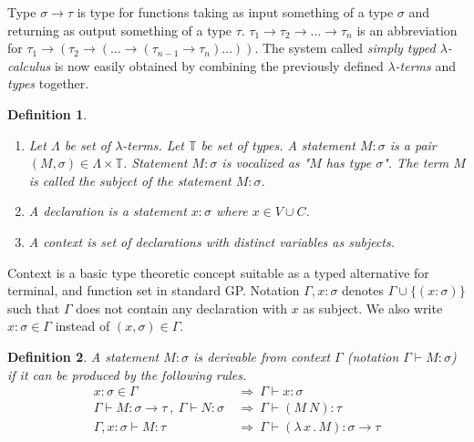 \documentclass{sig-alternate}
\newtheorem{definition}{Definition}
\newcommand{\lterms}{$\lambda$-terms\xspace}
\newcommand{\tur}[3]{#1\vdash{}#2 \colon #3}
\newcommand{\then}{\Rightarrow\xspace}
\newcommand{\lamb}[2]{( \lambda \, #1 \, . \, #2 )}
\newcommand{\ar}{\rightarrow\xspace}
\begin{document}
Type $\sigma \ar \tau$ is type for functions taking as input
something of a type $\sigma$ and returning 
as output something of a type $\tau$. 
$\tau_1 \ar \tau_2 \ar \dots \ar \tau_n$ is an abbreviation for 
$\tau_1 \ar (\tau_2 \ar (\dots \ar (\tau_{n-1} \ar \tau_n)\dots))$.
The system called \textit{simply typed $\lambda$-calculus} is now easily obtained by
combining the previously defined \textit{\lterms} and \textit{types} together.

\begin{definition}~

\begin{enumerate}
 \item 	Let $\Lambda$ be set of {\it \lterms}. 
	Let $\mathbb{T}$ be set of {\it types}.       
	A {\it statement} $M : \sigma$ is a pair 
	$(M,\sigma) \in \Lambda \times \mathbb{T}$.
	Statement $M : \sigma$ is vocalized as 
	{\it "$M$ has type $\sigma$"}.
	The term $M$ is called the {\it subject} of the 
	statement $M : \sigma$.
 \item A \textit{declaration} is a statement 
 $x : \sigma$ where $x \in V \cup C$.
  
 \item A \textit{context} 
 is set of declarations with distinct variables as subjects.
\end{enumerate}
\end{definition}

Context is a basic type theoretic concept suitable as a typed alternative
for terminal, and function set in standard GP. 
Notation $\Gamma,x:\sigma $ denotes $ \Gamma\cup\{(x:\sigma)\}$ 
such that $\Gamma$ does not contain any declaration with $x$ as subject.
We also write $x:\sigma \in \Gamma$ instead of $(x,\sigma) \in \Gamma$.

\begin{definition}
A statement $M\colon\sigma$ is \textit{derivable from}
context $\Gamma$ (notation 
\mbox{$\Gamma\vdash{}M\colon\sigma$}) 
if it can be produced by the following rules.
\begin{align*}
x : \sigma \in \Gamma &~\then~ \tur{\Gamma}{x}{\sigma}\\
\tur{\Gamma}{M}{\sigma \ar \tau}~,~\tur{\Gamma}{N}{\sigma} 
&~\then~ \tur{\Gamma}{(M~N)}{\tau}\\  
\tur{\Gamma,x:\sigma}{M}{\tau}
&~\then~ \tur{\Gamma}{\lamb{x}{M}}{\sigma \ar \tau} 
\end{align*}
\end{definition}
\end{document}
